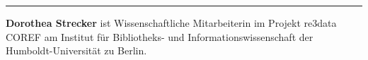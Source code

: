 \begin{center}\rule{0.5\linewidth}{0.5pt}\end{center}

\textbf{Dorothea Strecker} ist Wissenschaftliche Mitarbeiterin im
Projekt re3data COREF am Institut für Bibliotheks- und
Informationswissenschaft der Humboldt-Universität zu Berlin.
